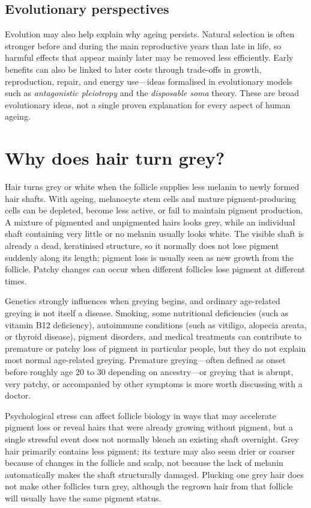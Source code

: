 \documentclass[11pt,oneside]{report}
\begin{document}
\subsection*{Evolutionary perspectives}

Evolution may also help explain why ageing persists. Natural selection is often
stronger before and during the main reproductive years than late in life, so
harmful effects that appear mainly later may be removed less efficiently. Early
benefits can also be linked to later costs through trade-offs in growth,
reproduction, repair, and energy use—ideas formalised in evolutionary models
such as \emph{antagonistic pleiotropy} and the \emph{disposable soma} theory.
These are broad evolutionary ideas, not a single proven explanation for every
aspect of human ageing.

\section{Why does hair turn grey?}

Hair turns grey or white when the follicle supplies less melanin to newly formed
hair shafts. With ageing, melanocyte stem cells and mature pigment-producing
cells can be depleted, become less active, or fail to maintain pigment
production. A mixture of pigmented and unpigmented hairs looks grey, while an
individual shaft containing very little or no melanin usually looks white. The
visible shaft is already a dead, keratinised structure, so it normally does not
lose pigment suddenly along its length; pigment loss is usually seen as new
growth from the follicle. Patchy changes can occur when different follicles
lose pigment at different times.

Genetics strongly influences when greying begins, and ordinary age-related
greying is not itself a disease. Smoking, some nutritional deficiencies (such as vitamin B12 deficiency),
autoimmune conditions (such as vitiligo, alopecia areata, or thyroid disease),
pigment disorders, and medical treatments can contribute
to premature or patchy loss of pigment in particular people, but they do not
explain most normal age-related greying. Premature greying—often defined as
onset before roughly age 20 to 30 depending on ancestry—or greying that is
abrupt, very patchy, or accompanied by other symptoms is more worth discussing
with a doctor.

Psychological stress can affect follicle biology in ways that may accelerate
pigment loss or reveal hairs that were already growing without pigment, but a
single stressful event does not normally bleach an existing shaft overnight.
Grey hair primarily contains less pigment; its texture may also seem drier or
coarser because of changes in the follicle and scalp, not because the lack of
melanin automatically makes the shaft structurally damaged. Plucking one grey
hair does not make other follicles turn grey, although the regrown hair from
that follicle will usually have the same pigment status.
\end{document}
